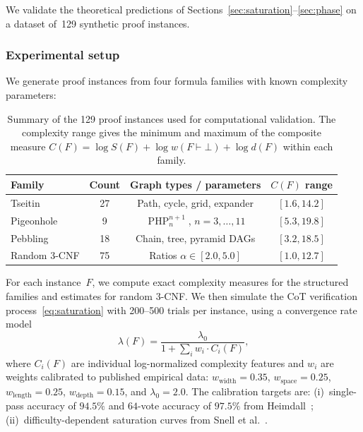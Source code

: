 We validate the theoretical predictions of
Sections~\ref{sec:saturation}--\ref{sec:phase} on a dataset of~129 synthetic
proof instances.

\subsubsection{Experimental setup}\label{sec:setup}

We generate proof instances from four formula families with known complexity
parameters:

\begin{table}[ht]
\centering
\caption{Summary of the 129 proof instances used for computational validation.
The complexity range gives the minimum and maximum of the composite measure
$C(F) = \log S(F) + \log w(F \vdash \bot) + \log d(F)$ within each
family.}\label{tab:instances}
\begin{tabular}{@{}lccc@{}}
\toprule
\textbf{Family} & \textbf{Count} & \textbf{Graph types / parameters}
  & \textbf{$C(F)$ range} \\
\midrule
Tseitin & 27 & Path, cycle, grid, expander & $[1.6, 14.2]$ \\
Pigeonhole & 9 & $\operatorname{PHP}^{n+1}_n$, $n = 3, \ldots, 11$
  & $[5.3, 19.8]$ \\
Pebbling & 18 & Chain, tree, pyramid DAGs & $[3.2, 18.5]$ \\
Random 3-CNF & 75 & Ratios $\alpha \in [2.0, 5.0]$ & $[1.0, 12.7]$ \\
\bottomrule
\end{tabular}
\end{table}

For each instance~$F$, we compute exact complexity measures for the structured
families and estimates for random $3$-CNF\@.  We then simulate the CoT
verification process~\eqref{eq:saturation} with 200--500 trials per instance,
using a convergence rate model
\begin{equation}\label{eq:lambda-model}
\lambda(F) = \frac{\lambda_0}{1 + \sum_{i} w_i \cdot C_i(F)},
\end{equation}
where $C_i(F)$ are individual log-normalized complexity features and
$w_i$ are weights calibrated to published empirical data: $w_{\text{width}} =
0.35$, $w_{\text{space}} = 0.25$, $w_{\text{length}} = 0.25$,
$w_{\text{depth}} = 0.15$, and $\lambda_0 = 2.0$.  The calibration targets
are: (i)~single-pass accuracy of $94.5\%$ and $64$-vote accuracy of $97.5\%$
from Heimdall~\cite{shi2025heimdall}; (ii)~difficulty-dependent saturation
curves from Snell et al.~\cite{snell2024scaling}.

